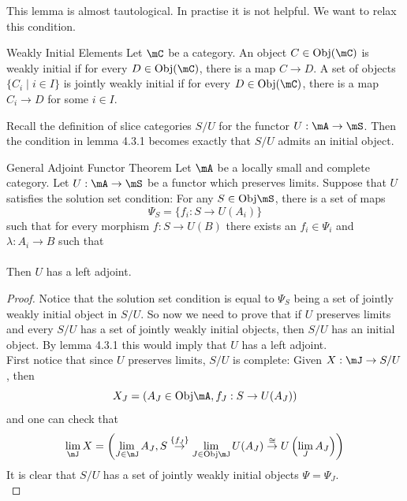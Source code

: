 \documentclass[a4paper]{article}
\begin{document}
This lemma is almost tautological. In practise it is not helpful. We want to relax this condition. 

\begin{defn}{Weakly Initial Elements}{} Let $\mC$ be a category. An object $C\in\text{Obj}(\mC)$ is weakly initial if for every $D\in\text{Obj}(\mC)$, there is a map $C\to D$. A set of objects $\{C_i\;|\;i\in I\}$ is jointly weakly initial if for every $D\in\text{Obj}(\mC)$, there is a map $C_i\to D$ for some $i\in I$. 
\end{defn}

Recall the definition of slice categories $S/U$ for the functor $U:\mA\to\mS$. Then the condition in lemma 4.3.1 becomes exactly that $S/U$ admits an initial object. 

\begin{thm}{General Adjoint Functor Theorem}{} Let $\mA$ be a locally small and complete category. Let $U:\mA\to\mS$ be a functor which preserves limits. Suppose that $U$ satisfies the solution set condition: For any $S\in\text{Obj}\mS$, there is a set of maps $$\Psi_S=\{f_i:S\to U(A_i)\}$$ such that for every morphism $f:S\to U(B)$ there exists an $f_i\in\Psi_i$ and $\lambda:A_i\to B$ such that \\
\\
Then $U$ has a left adjoint. 
\begin{proof}
Notice that the solution set condition is equal to $\Psi_S$ being a set of jointly weakly initial object in $S/U$. So now we need to prove that if $U$ preserves limits and every $S/U$ has a set of jointly weakly initial objects, then $S/U$ has an initial object. By lemma 4.3.1 this would imply that $U$ has a left adjoint. \\

First notice that since $U$ preserves limits, $S/U$ is complete: Given $X:\mJ\to S/U$, then $$X_J=\left(A_J\in\text{Obj}\mA,f_J:S\to U(A_J)\right)$$ and one can check that $$\lim_\mJ X=\left(\lim_{J\in\mJ}A_J,S\overset{\{f_J\}}{\to}\lim_{J\in\text{Obj}\mJ}U(A_J)\overset{\cong}{\to}U\left(\lim_JA_J\right)\right)$$ It is clear that $S/U$ has a set of jointly weakly initial objects $\Psi=\Psi_J$. \\


\end{proof}
\end{thm}
\end{document}

